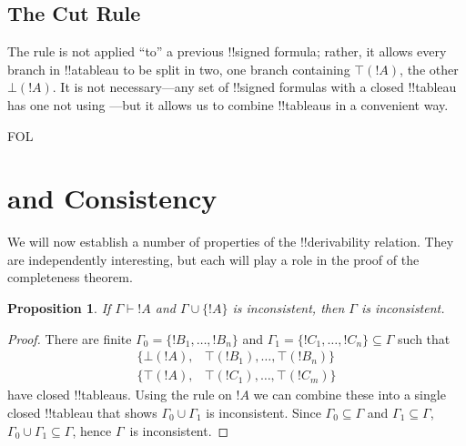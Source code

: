 \documentclass[10pt,a4paper]{article}
\theoremstyle{plain}
\newtheorem{prop}[thm]{Proposition}
\theoremstyle{definition}
\theoremstyle{remark}
\newcommand*{\olfileid}[3]{}
\newcommand*{\olsection}[1]{\section*{#1}}
\newcommand*{\ollabel}[1]{\label{#1}}
\providecommand{\AxiomC}[1]{}
\providecommand{\UnaryInfC}[1]{}
\providecommand{\RightLabel}[1]{}
\providecommand{\noLine}{}
\providecommand{\DisplayProof}{}
\providecommand{\lif}{\mathbin{\rightarrow}}
\providecommand{\Proves}{\mathrel{\vdash}}
\providecommand{\sFmla}[2]{#1(#2)}
\providecommand{\True}{\top}
\providecommand{\False}{\bot}
\providecommand{\iftag}[1]{#1}
\providecommand{\TRule}[1]{}
\providecommand{\Cut}{\mathrm{Cut}}
\providecommand{\iftag}{}
\begin{document}
\begin{defish}
\AxiomC{\sFmla{\True}{!A \lif !B}}
\RightLabel{\TRule{\True}{\lif}}
\UnaryInfC{$\sFmla{\False}{!A} \quad \mid \quad \sFmla{\True}{!B}$}
\DisplayProof
\hfill
\AxiomC{\sFmla{\False}{!A \lif !B}}
\RightLabel{\TRule{\False}{\lif}}
\UnaryInfC{\sFmla{\True}{!A}}
\noLine
\UnaryInfC{\sFmla{\False}{!B}}
\DisplayProof
\end{defish}

\subsection{The Cut Rule}

\begin{defish}
\AxiomC{}
\RightLabel{\Cut}
\UnaryInfC{$\sFmla{\True}{!A} \quad \mid \quad \sFmla{\False}{!A}$}
\DisplayProof
\end{defish}

The \Cut{} rule is not applied ``to'' a previous !!{signed formula}; rather,
it allows every branch in !!a{tableau} to be split in two, one branch
containing $\sFmla{\True}{!A}$, the other~$\sFmla{\False}{!A}$. It is
not necessary---any set of !!{signed formula}s with a closed
!!{tableau} has one not using \Cut---but it allows us to combine
!!{tableau}s in a convenient way.





\iftag{FOL}
      {\olfileid{fol}{tab}{prv}}
      {\olfileid{pl}{tab}{prv}}

\olsection{ and Consistency}

We will now establish a number of properties of the !!{derivability}
relation.  They are independently interesting, but each will play a
role in the proof of the completeness theorem.

\begin{prop}\ollabel{prop:provability-contr}
  If $\Gamma \Proves !A$ and $\Gamma \cup \{!A\}$ is
  inconsistent, then $\Gamma$ is inconsistent.
\end{prop}

\begin{proof}
There are finite $\Gamma_0 = \{!B_1, \dots, !B_n\}$ and $\Gamma_1
  =\{!C_1, \dots, !C_n\} \subseteq \Gamma$ such that
  \begin{align*}
    \{\sFmla{\False}{!A}, &
    \sFmla{\True}{!B_1}, \dots, \sFmla{\True}{!B_n}\} \\
    \{\sFmla{\True}{!A}, &
    \sFmla{\True}{!C_1}, \dots, \sFmla{\True}{!C_m}\}
  \end{align*}
  have closed !!{tableau}s.  Using the \Cut{} rule on $!A$ we can
  combine these into a single closed !!{tableau} that shows $\Gamma_0
  \cup \Gamma_1$ is inconsistent.  Since $\Gamma_0
  \subseteq \Gamma$ and $\Gamma_1 \subseteq \Gamma$, $\Gamma_0 \cup
  \Gamma_1 \subseteq \Gamma$, hence $\Gamma$~is inconsistent.
\end{proof}
\end{document}
